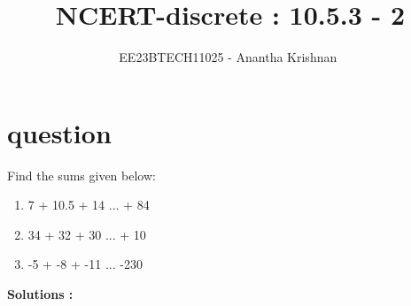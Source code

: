 \documentclass[journal,12pt,onecolumn]{IEEEtran}
\theoremstyle{remark}
\begin{document}

\vspace{3cm}

\title{NCERT-discrete : 10.5.3 - 2}
\author{EE23BTECH11025 - Anantha Krishnan $^{}$%
}
\maketitle
\bigskip



\section{question}
\vspace{0.5cm}
Find the sums given below:
\begin{enumerate}
    \item  7 + 10.5 + 14 ... + 84
    \item  34 + 32 + 30 ... + 10
    \item  -5 + -8 + -11 ... -230
\end{enumerate}

 \vspace{0.5cm}



\textbf{Solutions :}
\end{document}

